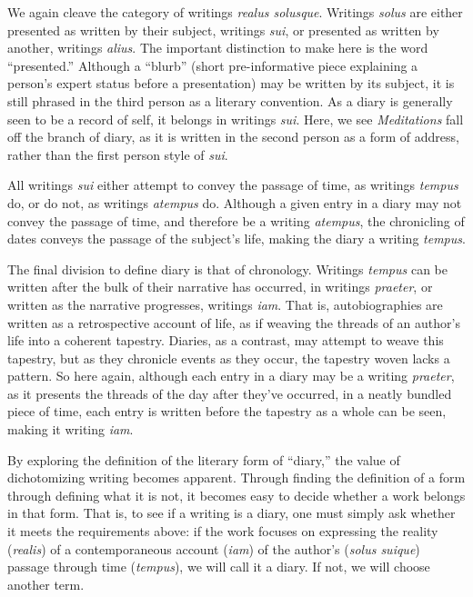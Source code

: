 \documentclass[12pt]{article}[titlepage]
\newcommand{\say}[1]{``#1''}
\newcommand{\1}{\={a}}
\newcommand{\2}{\={e}}
\newcommand{\3}{\={\i}}
\newcommand{\4}{\=o}
\newcommand{\5}{\=u}
\newcommand{\6}{\={A}}
\renewcommand{\,}{\textsuperscript{,}}
\begin{document}
We again cleave the category of writings \textit{realus solusque}.
Writings \textit{solus} are either presented as written by their subject, writings \textit{sui}, or presented as written by another, writings \textit{alius}.
The important distinction to make here is the word \say{presented.}
Although a \say{blurb} (short pre-informative piece explaining a person's expert status before a presentation) may be written by its subject, it is still phrased in the third person as a literary convention.
As a diary is generally seen to be a record of self, it belongs in writings \textit{sui}.
Here, we see \textit{Meditations} fall off the branch of diary, as it is written in the second person as a form of address, rather than the first person style of \textit{sui}. 

All writings \textit{sui} either attempt to convey the passage of time, as writings \textit{tempus} do, or do not, as writings \textit{atempus} do.
Although a given entry in a diary may not convey the passage of time, and therefore be a writing \textit{atempus}, the chronicling of dates conveys the passage of the subject's life, making the diary a writing \textit{tempus}.

The final division to define diary is that of chronology.
Writings \textit{tempus} can be written after the bulk of their narrative has occurred, in writings \textit{praeter}, or written as the narrative progresses, writings \textit{iam}.
That is, autobiographies are written as a retrospective account of life, as if weaving the threads of an  author's life into a coherent tapestry.
Diaries, as a contrast, may attempt to weave this tapestry, but as they chronicle events as they occur, the tapestry woven lacks a pattern.
So here again, although each entry in a diary may be a writing \textit{praeter}, as it presents the threads of the day after they've occurred, in a neatly bundled piece of time, each entry is written before the tapestry as a whole can be seen, making it writing \textit{iam}.

By exploring the definition of the literary form of \say{diary,} the value of dichotomizing writing becomes apparent.
Through finding the definition of a form through defining what it is not, it becomes easy to decide whether a work belongs in that form.
That is, to see if a writing is a diary, one must simply ask whether it meets the requirements above: if the work focuses on expressing the reality (\textit{realis}) of a contemporaneous account (\textit{iam}) of the author's (\textit{solus suique}) passage through time (\textit{tempus}), we will call it a diary.
If not, we will choose another term.
\end{document}
